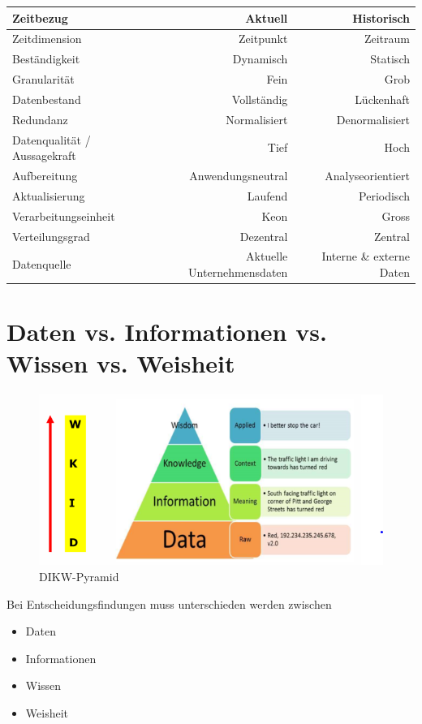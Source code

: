 \documentclass[a4paper, 11pt]{article}
\begin{document}
\begin{tabular}{|l|r|r|}
	\hline
	Zeitbezug & Aktuell & Historisch \\ 
	\hline
	Zeitdimension & Zeitpunkt & Zeitraum \\
	\hline
	Beständigkeit & Dynamisch & Statisch \\
	\hline
	Granularität & Fein & Grob \\
	\hline
	Datenbestand & Vollständig & Lückenhaft \\
	\hline
	Redundanz & Normalisiert & Denormalisiert \\
	\hline
	Datenqualität / Aussagekraft & Tief & Hoch \\
	\hline
	Aufbereitung & Anwendungsneutral & Analyseorientiert \\
	\hline
	Aktualisierung & Laufend & Periodisch \\
	\hline
	Verarbeitungseinheit & Keon & Gross \\
	\hline
	Verteilungsgrad & Dezentral & Zentral \\
	\hline
	Datenquelle & Aktuelle Unternehmensdaten & Interne \& externe Daten \\
\end{tabular} 

\newpage

\section{Daten vs. Informationen vs. Wissen vs. Weisheit}

\begin{figure}[htb]
	\centering
	\includegraphics[keepaspectratio=true,height=18\baselineskip]{DIWW.png}
	\caption{DIKW-Pyramid}
	\label{fig:dikw}
\end{figure}

Bei Entscheidungsfindungen muss unterschieden werden zwischen

\begin{itemize}
	\item Daten
	\item Informationen
	\item Wissen
	\item Weisheit
\end{itemize}
\end{document}
